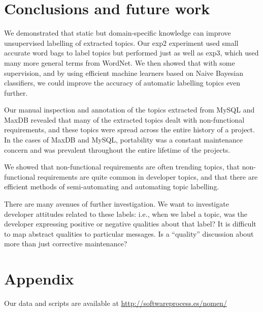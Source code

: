 \documentclass[]{sig-alternate}
\begin{document}
\section{Conclusions and future work}

We demonstrated that static but domain-specific knowledge can improve unsupervised labelling of extracted topics. Our \textsf{exp2} experiment used small accurate word bags to label topics but performed just as well as \textsf{exp3}, which used many more general terms from WordNet. We then showed that with some supervision, and by using efficient machine learners based on Naive Bayesian classifiers, we could improve the accuracy of automatic labelling topics even further.

Our manual inspection and annotation of the topics extracted from MySQL and MaxDB revealed that many of the extracted topics dealt with non-functional requirements, and these topics were spread across the entire history of a project. In the cases of MaxDB and MySQL, portability was a constant maintenance concern and was prevalent throughout the entire lifetime of the projects.

We showed that non-functional requirements are often trending topics, that non-functional requirements are quite common in developer topics, and that there are efficient methods of semi-automating and automating topic labelling.

There are many avenues of further investigation.  We want to investigate developer attitudes related to these labels: i.e., when we label a topic, was the developer expressing positive or negative qualities about that label?  It is difficult to map abstract qualities to particular messages. Is a ``quality'' discussion about more than just corrective maintenance? %

\section{Appendix}
Our data and scripts are available at \url{http://softwareprocess.es/nomen/}


%

\end{document}
